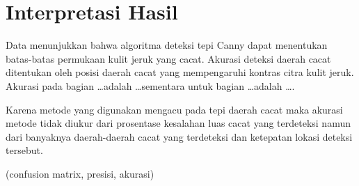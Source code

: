 \documentclass[laporan.tex]{subfiles}
\begin{document}
\section{Interpretasi Hasil}

Data menunjukkan bahwa algoritma deteksi tepi Canny dapat menentukan batas-batas permukaan kulit jeruk yang cacat. Akurasi deteksi daerah cacat ditentukan oleh posisi daerah cacat yang mempengaruhi kontras citra kulit jeruk. Akurasi pada bagian \ldots adalah \ldots sementara untuk bagian \ldots adalah \ldots.

Karena metode yang digunakan mengacu pada tepi daerah cacat maka akurasi metode tidak diukur dari prosentase kesalahan luas cacat yang terdeteksi namun dari banyaknya daerah-daerah cacat yang terdeteksi dan ketepatan lokasi deteksi tersebut.

(confusion matrix, presisi, akurasi)
\end{document}

